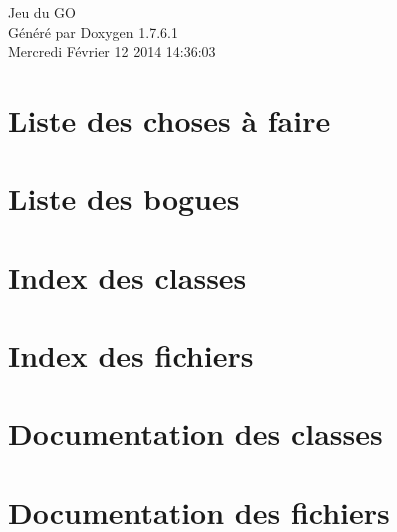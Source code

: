 \documentclass[a4paper]{book}
\begin{document}
\hypersetup{pageanchor=false,citecolor=blue}
\begin{titlepage}
\vspace*{7cm}
\begin{center}
{\Large \-Jeu du \-G\-O }\\
\vspace*{1cm}
{\large \-Généré par Doxygen 1.7.6.1}\\
\vspace*{0.5cm}
{\small Mercredi Février 12 2014 14:36:03}\\
\end{center}
\end{titlepage}
\clearemptydoublepage
{}
\tableofcontents
\clearemptydoublepage
{}
\hypersetup{pageanchor=true,citecolor=blue}
\chapter{\-Liste des choses à faire}
\label{todo}
\hypertarget{todo}{}

\chapter{\-Liste des bogues}
\label{bug}
\hypertarget{bug}{}

\chapter{\-Index des classes}

\chapter{\-Index des fichiers}

\chapter{\-Documentation des classes}







\chapter{\-Documentation des fichiers}
































\printindex
\end{document}
